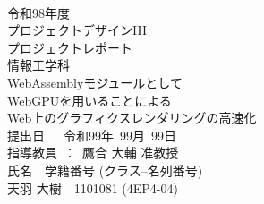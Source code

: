 
\begin{titlepage}
 \begin{center}
  ~\\
  \vspace{1cm}
  {\Large 
  令和98年度\\
 プロジェクトデザインIII\\
  プロジェクトレポート\\
情報工学科\\}
  \vspace{1.3in}
  {\Huge \gtfamily
WebAssemblyモジュールとして\\
WebGPUを用いることによる\\
Web上のグラフィクスレンダリングの高速化\\
  }
  \vspace{2in}
  {\LARGE 
  提出日~~~令和99年~99月~99日\\
  \vspace{0.4in}
  指導教員~：~鷹合 大輔 准教授\\
 \vspace{0.9in}
  氏名　学籍番号 (クラス--名列番号)\\
  \vspace{2mm}
  天羽 大樹　1101081 (4EP4-04)\\
  }
 \end{center}
\end{titlepage}
